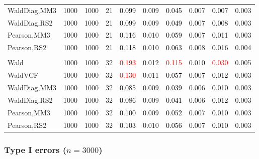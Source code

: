 \documentclass[
]{article}
\begin{document}
\begin{table}[H]
{\begin{tabular}[t]{lrrrrrrlrr}
\hspace{1em}WaldDiag,MM3 & 1000 & 1000 & 21 & \textcolor{black}{0.099} & 0.009 & \textcolor{black}{0.045} & 0.007 & \textcolor{black}{0.007} & 0.003\\
\hspace{1em}WaldDiag,RS2 & 1000 & 1000 & 21 & \textcolor{black}{0.099} & 0.009 & \textcolor{black}{0.049} & 0.007 & \textcolor{black}{0.008} & 0.003\\
\hspace{1em}Pearson,MM3 & 1000 & 1000 & 21 & \textcolor{black}{0.116} & 0.010 & \textcolor{black}{0.059} & 0.007 & \textcolor{black}{0.011} & 0.003\\
\hspace{1em}Pearson,RS2 & 1000 & 1000 & 21 & \textcolor{black}{0.118} & 0.010 & \textcolor{black}{0.063} & 0.008 & \textcolor{black}{0.016} & 0.004\\
\addlinespace[0.3em]
\multicolumn{10}{l}{\textbf{3F 15V}}\\
\hspace{1em}Wald & 1000 & 1000 & 32 & \textcolor{red}{0.193} & 0.012 & \textcolor{red}{0.115} & 0.010 & \textcolor{red}{0.030} & 0.005\\
\hspace{1em}WaldVCF & 1000 & 1000 & 32 & \textcolor{red}{0.130} & 0.011 & \textcolor{black}{0.057} & 0.007 & \textcolor{black}{0.012} & 0.003\\
\hspace{1em}WaldDiag,MM3 & 1000 & 1000 & 32 & \textcolor{black}{0.085} & 0.009 & \textcolor{black}{0.039} & 0.006 & \textcolor{black}{0.010} & 0.003\\
\hspace{1em}WaldDiag,RS2 & 1000 & 1000 & 32 & \textcolor{black}{0.086} & 0.009 & \textcolor{black}{0.041} & 0.006 & \textcolor{black}{0.012} & 0.003\\
\hspace{1em}Pearson,MM3 & 1000 & 1000 & 32 & \textcolor{black}{0.100} & 0.009 & \textcolor{black}{0.052} & 0.007 & \textcolor{black}{0.010} & 0.003\\
\hspace{1em}Pearson,RS2 & 1000 & 1000 & 32 & \textcolor{black}{0.103} & 0.010 & \textcolor{black}{0.056} & 0.007 & \textcolor{black}{0.010} & 0.003\\
\bottomrule
\end{tabular}}
\endgroup{}
\end{table}

\hypertarget{type-i-errors-n3000-2}{%
\subsubsection{\texorpdfstring{Type I errors
(\(n=3000\))}{Type I errors (n=3000)}}\label{type-i-errors-n3000-2}}
\end{document}
